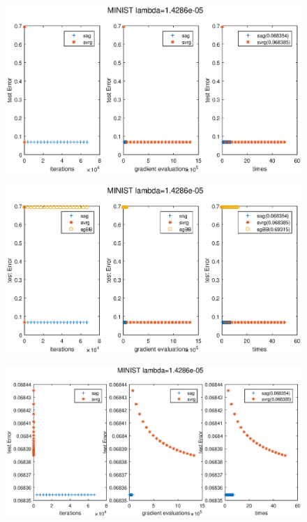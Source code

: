 \documentclass[UTF8]{ctexart}
\begin{document}
\begin{figure}[htbp]
\centering\includegraphics[width=5in]{1-n-a.eps}
\label{fig:1-n-a}
\end{figure}
\begin{figure}[htbp]
\centering\includegraphics[width=5in]{1-n-b.eps}
\label{fig:1-n-b}
\end{figure}

\begin{figure}[htbp]
\centering\includegraphics[width=5in]{1-n-c.eps}
\caption{}\label{fig:1-n-c}
\end{figure}
\end{document}
